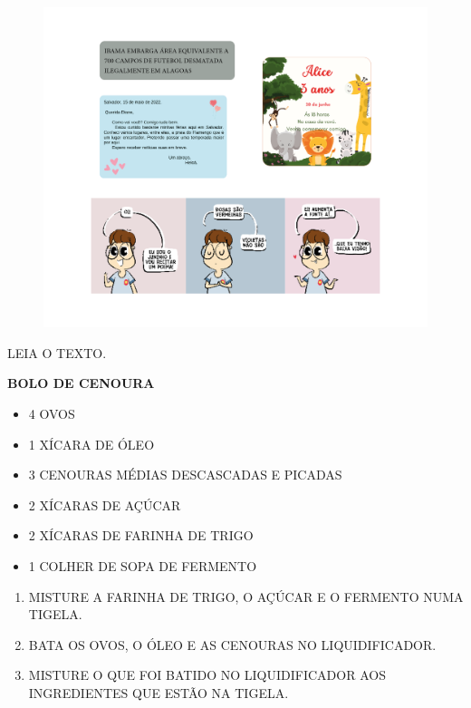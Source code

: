 \begin{figure}[H]
\centering
\includegraphics[width=\textwidth]{media/image141a152.png}
\end{figure}


LEIA O TEXTO.

\begin{myquote}
\textbf{BOLO DE CENOURA}


\begin{itemize}
\item 4 OVOS
\item 1 XÍCARA DE ÓLEO
\item 3 CENOURAS MÉDIAS DESCASCADAS E PICADAS
\item 2 XÍCARAS DE AÇÚCAR
\item 2 XÍCARAS DE FARINHA DE TRIGO
\item 1 COLHER DE SOPA DE FERMENTO
\end{itemize}

\begin{enumerate}
\item
  MISTURE A FARINHA DE TRIGO, O AÇÚCAR E O FERMENTO NUMA TIGELA.

\item
  BATA OS OVOS, O ÓLEO E AS CENOURAS NO LIQUIDIFICADOR.

\item
  MISTURE O QUE FOI BATIDO NO LIQUIDIFICADOR AOS INGREDIENTES QUE ESTÃO NA TIGELA.
\end{enumerate}
\end{myquote}

